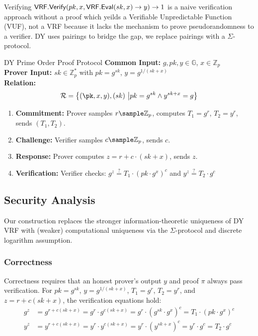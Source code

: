 \begin{remark}
    Verifying $\mathsf{VRF.Verify}(pk, x, \mathsf{VRF.Eval}(sk, x) \to y) \to 1$ is a naive verification approach without a proof which yeilds a Verifiable Unpredictable Function (VUF), not a VRF because it lacks the mechanism to prove pseudorandomness to a verifier. DY uses pairings to bridge the gap, we replace pairings with a $\Sigma$-protocol. 
\end{remark}

\begin{protocol}{DY Prime Order Proof Protocol}{}\label{protocol-pdy-protocol1}
\textbf{Common Input:} $g, pk, y \in \mathbb{G}$, $x \in \mathbb{Z}_p$ \\
\textbf{Prover Input:} $sk \in \mathbb{Z}_p^*$ with $pk = g^{sk}$, $y = g^{1/(sk + x)}$ \\
\textbf{Relation: }
\[
\mathcal{R} = \left\{ (\pk, x, y), (sk) \ \middle| pk = g^{sk} \land y^{sk + x} = g \right\}
\]
\begin{enumerate}
    \item \textbf{Commitment:} Prover samples $r \sample  \mathbb{Z}_p$, computes $T_1 = g^r$, $T_2 = y^r$, sends $(T_1, T_2)$.
    \item \textbf{Challenge:} Verifier samples $c \sample  \mathbb{Z}_p$, sends $c$.
    \item \textbf{Response:} Prover computes $z = r + c \cdot (sk + x)$, sends $z$.
    \item \textbf{Verification:} Verifier checks: $g^z \stackrel{?}{=} T_1 \cdot (pk \cdot g^x)^c$ and $y^z \stackrel{?}{=} T_2 \cdot g^c$
\end{enumerate}
\end{protocol}

\subsection{Security Analysis}

Our construction replaces the stronger information-theoretic uniqueness of DY VRF with (weaker) computational uniqueness via the $\Sigma$-protocol and discrete logarithm assumption.


\subsubsection{Correctness}

Correctness requires that an honest prover’s output $y$ and proof $\pi$ always pass verification. For $pk = g^{sk}$, $y = g^{1/(sk + x)}$, $T_1 = g^r$, $T_2 = y^r$, and $z = r + c(sk + x)$, the verification equations hold:
\begin{align*}
g^z &= g^{r + c(sk + x)} = g^r \cdot g^{c(sk + x)} = g^r \cdot (g^{sk} \cdot g^x)^c = T_1 \cdot (pk \cdot g^x)^c \\
y^z &= y^{r + c(sk + x)} = y^r \cdot y^{c(sk + x)} = y^r \cdot (y^{sk + x})^c = y^r \cdot g^c = T_2 \cdot g^c
\end{align*}

